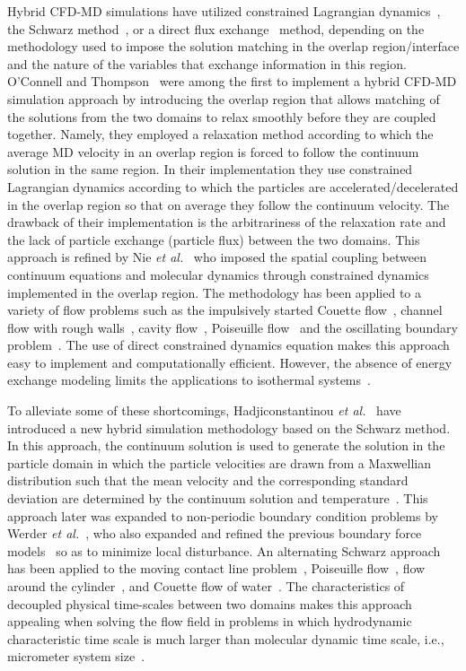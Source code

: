 \documentclass[preprint,12pt]{elsarticle}
\begin{document}
Hybrid CFD-MD simulations have utilized constrained Lagrangian dynamics~\cite{Thompson,Nie,Nie_cavity,Cui,Wang,Yen,Liu}, the Schwarz method~\cite{Hadjicon1,Hadjicon2,Hadjicon3,Werder,Kotsalis}, or a direct flux exchange~\cite{Flekkoy,Wagner,Delgado1,USHER,Time_Mechanism,Giupponi} method, depending on the methodology used to impose the solution matching in the overlap region/interface and the nature of the variables that exchange information in this region. 
O'Connell and Thompson~\cite{Thompson} 
were among the first to implement a hybrid CFD-MD simulation approach by introducing the overlap region that allows matching of the solutions from the two domains to relax smoothly before they are coupled together. Namely, they employed a relaxation method according to which the average MD velocity in an overlap region is forced to follow the continuum solution in the same region. In their implementation they use constrained Lagrangian dynamics according to which the particles are accelerated/decelerated in the overlap region so that on average they follow the continuum velocity. The drawback of their implementation is the arbitrariness of the relaxation rate and the lack of particle exchange (particle flux) between the two domains. 
This approach is refined by Nie {\it{et al.}}~\cite{Nie} 
who imposed the spatial coupling between continuum equations and molecular dynamics through constrained dynamics implemented in the overlap region.
The methodology has been applied to a variety of flow problems such as the impulsively started Couette flow~\cite{Thompson}, channel flow with rough walls~\cite{Nie}, cavity flow~\cite{Nie_cavity}, Poiseuille flow~\cite{Yen} and the oscillating boundary problem~\cite{Wang,Liu}. The use of direct constrained dynamics equation makes this approach easy to implement and computationally efficient. However, the absence of energy exchange modeling limits the applications to isothermal systems~\cite{Flekkoy}.

To alleviate some of these shortcomings, Hadjiconstantinou {\it{et al.}}~\cite{Hadjicon1,Hadjicon2,Hadjicon3} 
have introduced a new hybrid simulation methodology based on the Schwarz method. In this approach, the continuum solution is used to generate the solution in the particle domain in which the particle velocities are drawn from a Maxwellian distribution such that the mean velocity and the corresponding standard deviation are determined by the continuum solution and temperature~\cite{Hadjicon2}. This approach later was expanded to non-periodic boundary condition problems by Werder {\it{et al.}}~\cite{Werder}, who also expanded and refined the previous boundary force models~\cite{Thompson,Flekkoy,Delgado1,Nie} so as to minimize local disturbance. 
An alternating Schwarz approach has been applied to the moving contact line problem~\cite{Hadjicon2}, Poiseuille flow~\cite{Hadjicon3}, flow around the cylinder~\cite{Werder}, and Couette flow of water~\cite{Kotsalis}. The characteristics of decoupled physical time-scales between two domains makes this approach appealing when solving the flow field in problems in which hydrodynamic characteristic time scale is much larger than molecular dynamic time scale, i.e., micrometer system size~\cite{Hadjicon2}. 
\end{document}
